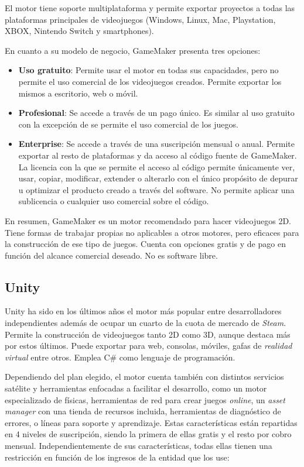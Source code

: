 El motor tiene soporte multiplataforma y permite exportar proyectos a todas las plataformas principales de videojuegos (Windows, Linux, Mac, Playstation, XBOX, Nintendo Switch y smartphones).

En cuanto a su modelo de negocio, GameMaker presenta tres opciones:

\begin{itemize}
    \item \textbf{Uso gratuito}: Permite usar el motor en todas sus capacidades, pero no permite el uso comercial de los videojuegos creados. Permite exportar los mismos a escritorio, web o móvil.
    \item \textbf{Profesional}: Se accede a través de un pago único. Es similar al uso gratuito con la excepción de se permite el uso comercial de los juegos.
    \item \textbf{Enterprise}: Se accede a través de una suscripción mensual o anual. Permite exportar al resto de plataformas y da acceso al código fuente de GameMaker. La licencia con la que se permite el acceso al código permite únicamente ver, usar, copiar, modificar, extender o alterarlo con el único propósito de depurar u optimizar el producto creado a través del software. No permite aplicar una sublicencia o cualquier uso comercial sobre el código.
\end{itemize}

En resumen, GameMaker es un motor recomendado para hacer videojuegos 2D. Tiene formas de trabajar propias no aplicables a otros motores, pero eficaces para la construcción de ese tipo de juegos. Cuenta con opciones gratis y de pago en función del alcance comercial deseado. No es software libre.

\subsection{Unity}

Unity \cite{Unity} ha sido en los últimos años el motor más popular entre desarrolladores independientes además de ocupar un cuarto \cite{game-engine-report} de la cuota de mercado de \textit{Steam}. Permite la construcción de videojuegos tanto 2D como 3D, aunque destaca más por estos últimos. Puede exportar para web, consolas, móviles, gafas de \textit{realidad virtual} entre otros. Emplea C\# como lenguaje de programación.

Dependiendo del plan elegido, el motor cuenta también con distintos servicios satélite y herramientas enfocadas a facilitar el desarrollo, como un motor especializado de físicas, herramientas de red para crear juegos \textit{online}, un \textit{asset manager} con una tienda de recursos incluida, herramientas de diagnóstico de errores, o líneas para soporte y aprendizaje. Estas características están repartidas en 4 niveles de suscripción, siendo la primera de ellas gratis y el resto por cobro mensual. Independientemente de sus características, todas ellas tienen una restricción \cite{unity-license} en función de los ingresos de la entidad que los use:

